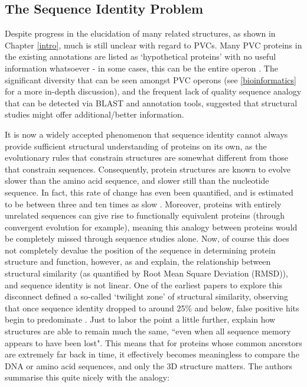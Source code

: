 \subsection{The Sequence Identity Problem}
Despite progress in the elucidation of many related structures, as shown in Chapter \ref{intro}, much is still unclear with regard to PVCs. Many PVC proteins in the existing \Pa{} annotations are listed as `hypothetical proteins' with no useful information whatsoever - in some cases, this can be the entire operon \citep{Duchaud2003}. The significant diversity that can be seen amongst PVC operons (see \vref{bioinformatics} for a more in-depth discussion), and the frequent lack of quality sequence analogy that can be detected via BLAST and annotation tools, suggested that structural studies might offer additional/better information.

It is now a widely accepted phenomenon that sequence identity cannot always provide sufficient structural understanding of proteins on its own, as the evolutionary rules that constrain structures are somewhat different from those that constrain sequences. Consequently, protein structures are known to evolve slower than the amino acid sequence, and slower still than the nucleotide sequence. In fact, this rate of change has even been quantified, and is estimated to be between three and ten times as slow \citep{Illergard2009}. Moreover, proteins with entirely unrelated sequences can give rise to functionally equivalent proteins (through convergent evolution for example), meaning this analogy between proteins would be completely missed through sequence studies alone. Now, of course this does not completely devalue the position of the sequence in determining protein structure and function, however, as \cite{Illergard2009} and \cite{Chothia1986} explain, the relationship between structural similarity (as quantified by Root Mean Square Deviation (RMSD)), and sequence identity is not linear. One of the earliest papers to explore this disconnect defined a so-called `twilight zone' of structural similarity, observing that once sequence identity dropped to around 25\% and below, false positive hits begin to predominate \citep{rost1999twilight}. Just to labor the point a little further, \cite{Holm1996} explain how structures are able to remain much the same, ``even when all sequence memory appears to have been lost". This means that for proteins whose common ancestors are extremely far back in time, it effectively becomes meaningless to compare the DNA or amino acid sequences, and only the 3D structure matters. The authors summarise this quite nicely with the analogy:

